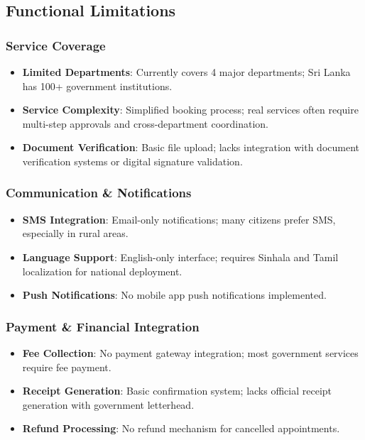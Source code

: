 \documentclass[12pt,a4paper]{article}
\begin{document}
\subsection{Functional Limitations}

\subsubsection{Service Coverage}
\begin{itemize}[leftmargin=*]
    \item \textbf{Limited Departments}: Currently covers 4 major departments; Sri Lanka has 100+ government institutions.
    \item \textbf{Service Complexity}: Simplified booking process; real services often require multi-step approvals and cross-department coordination.
    \item \textbf{Document Verification}: Basic file upload; lacks integration with document verification systems or digital signature validation.
\end{itemize}

\subsubsection{Communication \& Notifications}
\begin{itemize}[leftmargin=*]
    \item \textbf{SMS Integration}: Email-only notifications; many citizens prefer SMS, especially in rural areas.
    \item \textbf{Language Support}: English-only interface; requires Sinhala and Tamil localization for national deployment.
    \item \textbf{Push Notifications}: No mobile app push notifications implemented.
\end{itemize}

\subsubsection{Payment \& Financial Integration}
\begin{itemize}[leftmargin=*]
    \item \textbf{Fee Collection}: No payment gateway integration; most government services require fee payment.
    \item \textbf{Receipt Generation}: Basic confirmation system; lacks official receipt generation with government letterhead.
    \item \textbf{Refund Processing}: No refund mechanism for cancelled appointments.
\end{itemize}
\end{document}
